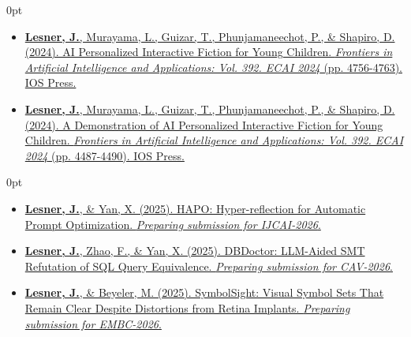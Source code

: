 \documentclass[11pt]{article}
\newlength{\sectionwidth}
\newcommand{\CVSection}[2]{%
  \vspace{1.4em} 
  \noindent
  \makebox[0pt][l]{%
    \parbox[t]{\sectionwidth}{%
      \raggedright\scshape\bfseries\small #1%
    }%
  }%
  \begin{adjustwidth}{\sectionwidth}{0pt}
    #2
  \end{adjustwidth}
}
\begin{document}
\CVSection{Publications}{%
  \begin{itemize}
      \item \href{https://doi.org/10.3233/FAIA241074}{\textbf{Lesner, J.}, Murayama, L., Guizar, T., Phunjamaneechot, P., \& Shapiro, D. (2024). AI Personalized Interactive Fiction for Young Children. \textit{Frontiers in Artificial Intelligence and Applications: Vol. 392. ECAI 2024} (pp. 4756-4763). IOS Press.}
      
      \item \href{https://doi.org/10.3233/FAIA241036}{\textbf{Lesner, J.}, Murayama, L., Guizar, T., Phunjamaneechot, P., \& Shapiro, D. (2024). A Demonstration of AI Personalized Interactive Fiction for Young Children. \textit{Frontiers in Artificial Intelligence and Applications: Vol. 392. ECAI 2024} (pp. 4487-4490). IOS Press.\\ }
  \end{itemize}
}



\CVSection{Preprints}{%
  \begin{itemize}

      \item \href{https://jlesner0.ackop.com/hapo_0023.pdf}{\textbf{Lesner, J.}, \& Yan, X. (2025). HAPO: Hyper-reflection for Automatic Prompt Optimization. \textit{Preparing submission for IJCAI-2026}.}
      
      \item \href{https://jlesner0.ackop.com/dbdoctor_cav_0036.pdf}{\textbf{Lesner, J.}, Zhao, F., \& Yan, X. (2025). DBDoctor: LLM-Aided SMT Refutation of SQL Query Equivalence. \textit{Preparing submission for CAV-2026}.}

      \item \href{https://jlesner0.ackop.com/symbolsight_0034.pdf}{\textbf{Lesner, J.}, \& Beyeler, M. (2025). SymbolSight: Visual Symbol Sets That Remain Clear Despite Distortions from Retina Implants. \textit{Preparing submission for EMBC-2026}.}
  \end{itemize}
}
\end{document}

